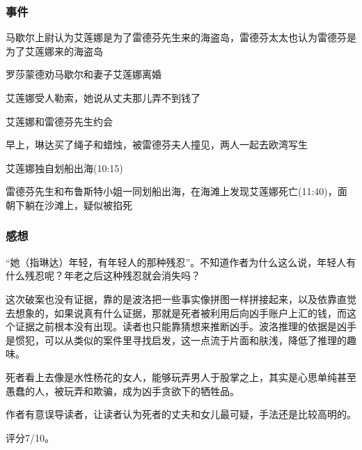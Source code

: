 \subsubsection{事件}
马歇尔上尉认为艾莲娜是为了雷德芬先生来的海盗岛，雷德芬太太也认为雷德芬是为了艾莲娜来的海盗岛

罗莎蒙德劝马歇尔和妻子艾莲娜离婚

艾莲娜受人勒索，她说从丈夫那儿弄不到钱了

艾莲娜和雷德芬先生约会

早上，琳达买了绳子和蜡烛，被雷德芬夫人撞见，两人一起去欧湾写生

艾莲娜独自划船出海(10:15)

雷德芬先生和布鲁斯特小姐一同划船出海，在海滩上发现艾莲娜死亡(11:40)，面朝下躺在沙滩上，疑似被掐死

\subsubsection{感想}
“她（指琳达）年轻，有年轻人的那种残忍”。不知道作者为什么这么说，年轻人有什么残忍呢？年老之后这种残忍就会消失吗？

这次破案也没有证据，靠的是波洛把一些事实像拼图一样拼接起来，以及依靠直觉去想象的，如果说真有什么证据，那就是死者被利用后向凶手账户上汇的钱，而这个证据之前根本没有出现。读者也只能靠猜想来推断凶手。波洛推理的依据是凶手是惯犯，可以从类似的案件里寻找启发，这一点流于片面和肤浅，降低了推理的趣味。

死者看上去像是水性杨花的女人，能够玩弄男人于股掌之上，其实是心思单纯甚至愚蠢的人，被玩弄和欺骗，成为凶手贪欲下的牺牲品。

作者有意误导读者，让读者认为死者的丈夫和女儿最可疑，手法还是比较高明的。

评分7/10。